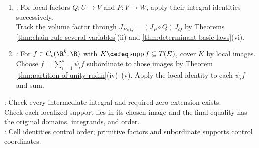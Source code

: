 \begin{proofmethod}
\begin{enumerate}[label=(\roman*)]
Restrict each primitive factor to a box on which it is a diffeomorphism.\\
Close its integral identity by Theorem \ref{thm:riemann-stieltjes-change-of-variable}(v), and close flips by Theorem \ref{thm:linear-map-volume-scaling-determinant}.
\item {}: For local factors $Q:U\to V$ and $P:V\to W$, apply their integral identities successively.\\
Track the volume factor through $J_{P\circ Q}=(J_P\circ Q)J_Q$ by Theorems \ref{thm:chain-rule-several-variables}(ii) and \ref{thm:determinant-basic-laws}(vi).
\item {}: For $f\in C_c(\R^k,\R)$ with $K\defeq\operatorname{supp}f\subseteq T(E)$, cover $K$ by local images.\\
Choose $f=\sum\limits_{i=1}^{s}\psi_i f$ subordinate to those images by Theorem \ref{thm:partition-of-unity-rudin}(iv)--(v). Apply the local identity to each $\psi_i f$ and sum.
\end{enumerate}
: Check every intermediate integral and required zero extension exists.\\
Check each localized support lies in its chosen image and the final equality has the original domains, integrands, and order.\\
: Cell identities control order; primitive factors and subordinate supports control coordinates.
\end{proofmethod}
